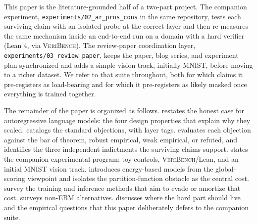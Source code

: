 This paper is the literature-grounded half of a two-part project.
The companion experiment, \texttt{experiments/02\_ar\_pros\_cons} in the same repository, tests each surviving claim with an isolated probe at the correct layer and then re-measures the same mechanism inside an end-to-end run on a domain with a hard verifier (Lean 4, via \textsc{VeriBench}).
The review-paper coordination layer, \texttt{experiments/03\_review\_paper}, keeps the paper, blog series, and experiment plan synchronized and adds a simple vision track, initially \textsc{MNIST}, before moving to a richer dataset.
We refer to that suite throughout, both for which claims it pre-registers as load-bearing and for which it pre-registers as likely masked once everything is trained together.

The remainder of the paper is organized as follows.
 restates the honest case for autoregressive language models: the four design properties that explain why they scaled.
 catalogs the standard objections, with layer tags.
 evaluates each objection against the bar of theorem, robust empirical, weak empirical, or refuted, and identifies the three independent indictments the surviving claims support.
 states the companion experimental program: toy controls, \textsc{VeriBench}/Lean, and an initial \textsc{MNIST} vision track.
 introduces energy-based models from the global-scoring viewpoint and isolates the partition-function obstacle as the central cost.
 survey the training and inference methods that aim to evade or amortize that cost.
 surveys non-EBM alternatives.
 discusses where the hard part should live and the empirical questions that this paper deliberately defers to the companion suite.
